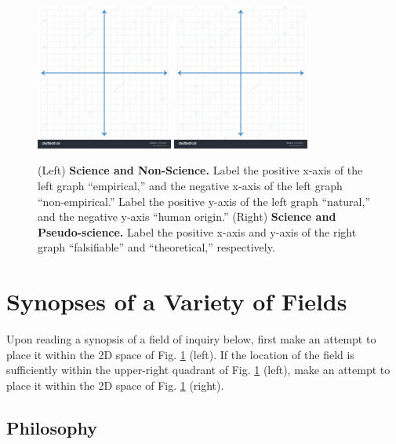 \documentclass[12pt]{article}
\begin{document}
\begin{figure}[h]
\centering
\includegraphics[width=0.4\textwidth,trim=0cm 3.6cm 0cm 0cm,clip=true]{figures/graph.jpg}
\includegraphics[width=0.4\textwidth,trim=0cm 3.6cm 0cm 0cm,clip=true]{figures/graph.jpg}
\caption{\label{fig:1} (Left) \textbf{Science and Non-Science.} Label the positive x-axis of the left graph ``empirical,'' and the negative x-axis of the left graph ``non-empirical.''  Label the positive y-axis of the left graph ``natural,'' and the negative y-axis ``human origin.''  (Right) \textbf{Science and Pseudo-science.} Label the positive x-axis and y-axis of the right graph ``falsifiable'' and ``theoretical,'' respectively.}
\end{figure}

\section{Synopses of a Variety of Fields}

Upon reading a synopsis of a field of inquiry below, first make an attempt to place it within the 2D space of Fig. \ref{fig:1} (left).  If the location of the field is sufficiently within the upper-right quadrant of Fig. \ref{fig:1} (left), make an attempt to place it within the 2D space of Fig. \ref{fig:1} (right).

\subsection{Philosophy}
\end{document}

